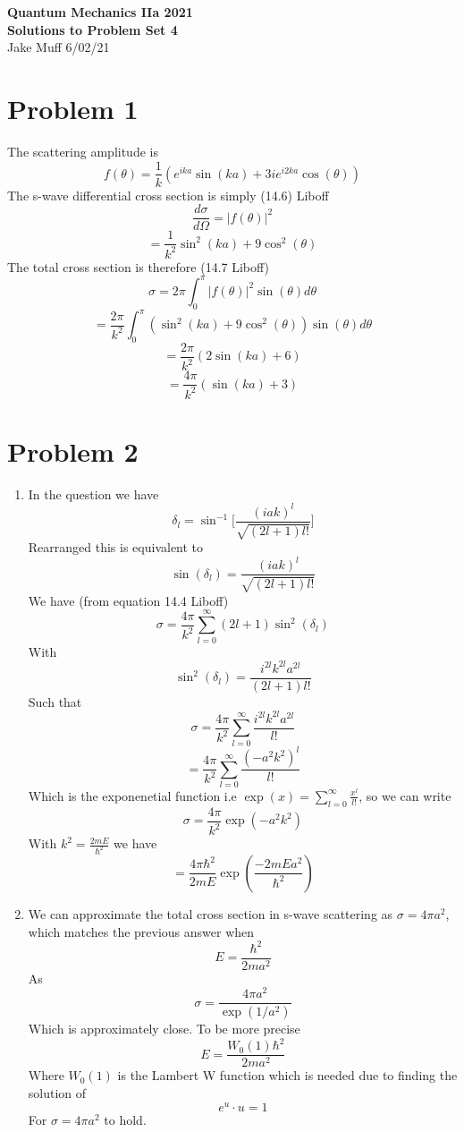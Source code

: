 \documentclass[12pt]{article}
\begin{document}
\normalsize

\baselineskip 14pt

\begin{center}
{\Large {\bf Quantum Mechanics IIa 2021 \ \ \\ Solutions to Problem Set 4}} \\
Jake Muff
6/02/21
\end{center}
\section*{Problem 1}
The scattering amplitude is 
$$ f(\theta) = \frac{1}{k} (e^{ika} \sin (ka) + 3i e^{i2ka} \cos(\theta)) $$
The s-wave differential cross section is simply (14.6) Liboff
$$\frac{d \sigma}{d \Omega} = | f(\theta) |^2 $$
$$ = \frac{1}{k^2} \sin^2(ka)+9 \cos^2(\theta)$$
The total cross section is therefore (14.7 Liboff)
$$ \sigma = 2 \pi \int_0^{\pi} | f(\theta) |^2 \sin(\theta) d \theta $$
$$ = \frac{2 \pi}{k^2} \int_0^{\pi} (\sin^2 (ka) + 9 \cos^2 (\theta) ) \sin(\theta) d \theta $$
$$ = \frac{2 \pi}{k^2} (2 \sin(ka) +6) $$
$$ = \frac{4 \pi}{k^2} ( \sin(ka) +3) $$


\section*{Problem 2} 
\begin{enumerate}
    \item %
    In the question we have 
    $$ \delta_l = \sin^{-1} \Big[ \frac{(iak)^l}{\sqrt{(2l+1)l!}}\Big] $$
    Rearranged this is equivalent to 
    $$ \sin (\delta_l)  = \frac{(iak)^l}{\sqrt{(2l+1)l!}} $$
    We have (from equation 14.4 Liboff) 
    $$ \sigma = \frac{4 \pi}{k^2} \sum_{l=0}^{\infty} (2l+1) \sin^2 (\delta_l) $$
    With
    $$ \sin^2 (\delta_l) = \frac{i^{2l} k^{2l} a^{2l}}{(2l+1)l!} $$
    Such that 
    $$ \sigma = \frac{4 \pi }{k^2} \sum_{l=0}^{\infty} \frac{i^{2l} k^{2l} a^{2l} }{l!} $$
    $$ = \frac{4 \pi}{k^2} \sum_{l=0}^{\infty} \frac{(-a^2 k^2)^l}{l!} $$
    Which is the exponenetial function i.e $\exp(x) = \sum_{l=0}^{\infty} \frac{x^l}{l!} $, so we can write 
    $$ \sigma = \frac{4 \pi}{k^2} \exp(-a^2 k^2) $$
    With $k^2 = \frac{2mE}{\hbar^2} $ we have 
    $$ = \frac{4 \pi \hbar^2}{2mE} \exp(\frac{-2mE a^2}{\hbar^2}) $$

    \item We can approximate the total cross section in s-wave scattering as $\sigma = 4 \pi a^2$, which matches
    the previous answer when 
    $$ E = \frac{\hbar^2}{2 m a^2} $$ 
    As 
    $$ \sigma = \frac{4 \pi a^2}{\exp(1/a^2)} $$
    Which is approximately close. To be more precise 
    $$ E = \frac{W_0(1) \hbar^2}{2ma^2} $$
    Where $W_0(1)$ is the Lambert W function which is needed due to finding the solution of 
    $$ e^u \cdot u = 1$$
    For $\sigma=4 \pi a^2$ to hold. 
\end{enumerate}
\end{document}
